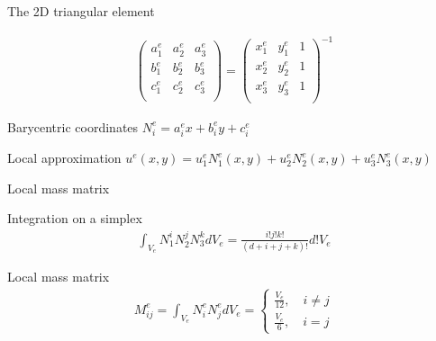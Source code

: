 \documentclass[handout]{beamer}
{
\usepackage{fullpage}
\usepackage{hyperref}
\usepackage{amssymb} 
}
\newcommand{\pmat}[1]{\begin{pmatrix}#1\end{pmatrix}}
\begin{document}
\begin{frame}{The 2D triangular element}
\centering
\begin{minipage}{0.65\textwidth}
\begin{align*}
\pmat{a^e_1 & a^e_2 & a^e_3 \\
      b^e_1 & b^e_2 & b^e_3 \\
      c^e_1 & c^e_2 & c^e_3 \\
}
=
\pmat{x^e_1 & y^e_1 & 1     \\
      x^e_2 & y^e_2 & 1     \\
      x^e_3 & y^e_3 & 1     \\
}^{-1} 
\end{align*}
\end{minipage}

\bigskip

\begin{minipage}{0.45\textwidth}
\begin{block}{Barycentric coordinates}
$N_i^e = a^e_i x + b^e_i y + c^e_i$
\end{block}
\end{minipage}

\bigskip

\begin{minipage}{0.75\textwidth}
\begin{block}{Local approximation}
$u^e(x,y) = u^e_1 N^e_1(x,y) + u^e_2 N^e_2(x,y) + u^e_3 N^e_3(x,y)$
\end{block}
\end{minipage}

\end{frame}


\begin{frame}{Local mass matrix}
\centering
\begin{minipage}{0.65\textwidth}

\begin{block}{Integration on a simplex}
\begin{align*}
\int_{V_e} N_1^i N_2^j N_3^k d V_e = \frac{i! j! k!}{(d + i + j + k)!} d! V_{e}
\end{align*}
\end{block}

\bigskip 

\begin{block}{Local mass matrix}
\begin{align*}
M_{ij}^e = \int_{V_e} N_i^e N_j^e d V_e = 
\begin{cases}
\frac{V_e}{12}, \quad i \ne j  \\
\frac{V_e}{6}, \quad i = j  
\end{cases}
\end{align*}
\end{block}
\end{minipage}
\end{frame}
\end{document}
